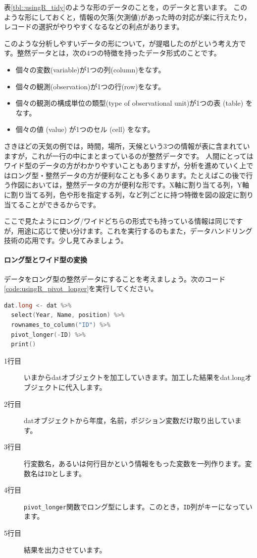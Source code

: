 \documentclass{ltjsbook}
\begin{document}
表\ref{tbl::usingR_tidy}のような形のデータのことを，のデータと言います。
このような形にしておくと，情報の欠落(欠測値)があった時の対応が楽に行えたり，レコードの選択がやりやすくなるなどの利点があります。

このような分析しやすいデータの形について，\textcite{Hadley2014}が提唱したのがという考え方です。整然データとは，次の4つの特徴を持ったデータ形式のことです。
\begin{itemize}
	\item 個々の変数(variable)が1つの列(column)をなす。
	\item 個々の観測(observation)が1つの行(row)をなす。
	\item 個々の観測の構成単位の類型(type of observational unit)が1つの表 (table) をなす。
	\item 個々の値 (value) が1つのセル (cell) をなす。
\end{itemize}
さきほどの天気の例では，時間，場所，天候という3つの情報が表に含まれていますが，これが一行の中にまとまっているのが整然データです。
人間にとってはワイド型のデータの方がわかりやすいこともありますが，分析を進めていく上ではロング型・整然データの方が便利なことも多くあります。たとえばこの後で行う作図においては，整然データの方が便利な形です。X軸に割り当てる列，Y軸に割り当てる列，色や形を指定する列，など列ごとに持つ特徴を図の設定に割り当てることができるからです。

ここで見たようにロング/ワイドどちらの形式でも持っている情報は同じですが，用途に応じて使い分けます。これを実行するのもまた，データハンドリング技術の応用です。少し見てみましょう。

\paragraph{ロング型とワイド型の変換}
データをロング型の整然データにすることを考えましょう。次のコード\ref{code:usingR_pivot_longer}を実行してください。
\begin{lstlisting}[language=c++,label={code:usingR_pivot_longer},caption={ロング型にする関数}]
dat.long <- dat %>%
  select(Year, Name, position) %>%
  rownames_to_column("ID") %>%
  pivot_longer(-ID) %>%
  print() 
\end{lstlisting}

\begin{description}
	\item[1行目] いまからdatオブジェクトを加工していきます。加工した結果をdat.longオブジェクトに代入します。
	\item[2行目] datオブジェクトから年度，名前，ポジション変数だけ取り出しています。
	\item[3行目] 行変数名，あるいは何行目かという情報をもった変数を一列作ります。変数名は\verb|ID|とします。
	\item[4行目] \verb|pivot_longer|関数でロング型にします。このとき，\verb|ID|列がキーになっています。
	\item[5行目] 結果を出力させています。
\end{description}
\end{document}
